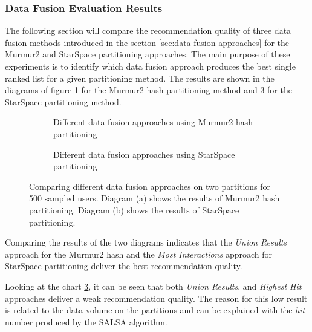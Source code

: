 \subsubsection{Data Fusion Evaluation Results}
\label{subsubsec:eval-data-fusion}
The following section will compare the recommendation quality of three data fusion methods introduced in the section \ref{sec:data-fusion-approaches} for the Murmur2 and StarSpace partitioning approaches. The main purpose of these experiments is to identify which data fusion approach produces the best single ranked list for a given partitioning method. The results are shown in the diagrams of figure \ref{plot:murmur2-data-fusion} for the Murmur2 hash partitioning method and \ref{plot:star-space-data-fusion} for the StarSpace partitioning method.


\begin{figure}[!htb]
    \centering
    \begin{subfigure}{\textwidth}
        \centering
        
        \caption{Different data fusion approaches using Murmur2 hash partitioning}
        \label{plot:murmur2-data-fusion}
    \end{subfigure}\qquad

    \begin{subfigure}{\textwidth}
        \centering
        
        \caption{Different data fusion approaches using StarSpace partitioning}
        \label{plot:star-space-data-fusion}
    \end{subfigure}\qquad
    \caption{Comparing different data fusion approaches on two partitions for 500 sampled users. Diagram (a) shows the results of Murmur2 hash partitioning. Diagram (b) shows the results of StarSpace partitioning.}
\end{figure}


Comparing the results of the two diagrams indicates that the \emph{Union Results} approach for the Murmur2 hash and the \emph{Most Interactions} approach for StarSpace partitioning deliver the best recommendation quality. 


Looking at the chart \ref{plot:star-space-data-fusion}, it can be seen that both \emph{Union Results}, and \emph{Highest Hit} approaches deliver a weak recommendation quality. The reason for this low result is related to the data volume on the partitions and can be explained with the \emph{hit} number produced by the SALSA algorithm. 


